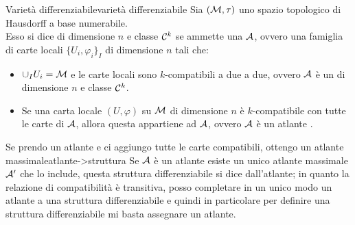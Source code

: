 \documentclass[annatarbolditalic, openany]{book}
\begin{document}
\begin{definition}{Varietà differenziabile}{varietà differenziabile}
    Sia $(\mathcal{M},\tau)$ uno spazio topologico di Hausdorff a base numerabile.\\
    Esso si dice  di dimensione $n$ e classe $\mathcal{C}^k$ se ammette una  $\mathcal{A}$, ovvero una famiglia di carte locali $\{U_i, \varphi_i\}_I$ di dimensione $n$ tali che:\begin{itemize}
        \item $\cup_I U_i = \mathcal{M}$ e le carte locali sono $k$-compatibili a due a due, ovvero $\mathcal{A}$ è un  di dimensione $n$ e classe $\mathcal{C}^k$.
        \item Se una carta locale $(U,\varphi)$ su $\mathcal{M}$ di dimensione $n$ è $k$-compatibile con tutte le carte di $\mathcal{A}$, allora questa appartiene ad $\mathcal{A}$, ovvero $\mathcal{A}$ è un atlante .
    \end{itemize}
\end{definition}


\begin{remark}{Se prendo un atlante e ci aggiungo tutte le carte compatibili, ottengo un atlante massimale}{atlante->struttura}
    Se $\mathcal{A}$ è un atlante esiste un unico atlante massimale $\mathcal{A}'$ che lo include, questa struttura differenziabile si dice  dall'atlante; in quanto la relazione di compatibilità è transitiva, posso completare in un unico modo un atlante a una struttura differenziabile e quindi in particolare per definire una struttura differenziabile mi basta assegnare un atlante.
\end{remark}


\end{document}
